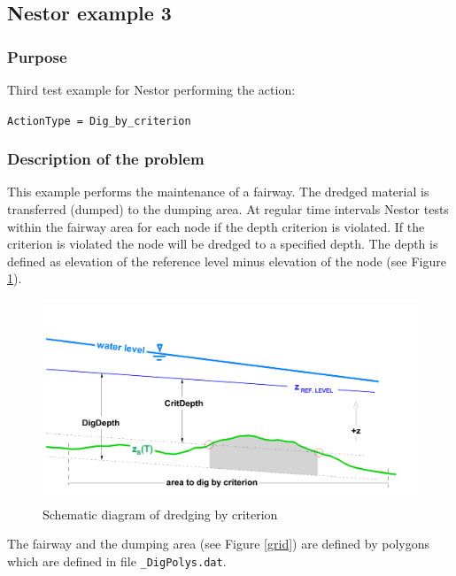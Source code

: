 \subsection{Nestor example 3}
%

%
\subsubsection{Purpose}
%
Third test example for Nestor performing the action:

\texttt{ActionType = Dig\_by\_criterion}
%
\subsubsection{Description of the problem}
%
This example performs the maintenance of a fairway. The dredged material is transferred (dumped) to the dumping area.
At regular time intervals Nestor tests within the fairway area for each node if the depth criterion is violated. If the criterion is violated the node will be dredged to a specified depth. 
The depth is defined as elevation of the reference level minus elevation of the node (see Figure \ref{schema}).        

\begin{figure} [!h]
	\centering
	\includegraphics[scale=0.12]{../img/critDig_schematicDiagram.png}
	\caption{Schematic diagram of dredging by criterion}\label{schema}
\end{figure}


The fairway and the dumping area (see Figure \ref{grid}) are defined by polygons which are defined in file \texttt{\_DigPolys.dat}.


